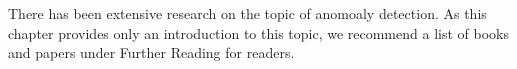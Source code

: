 There has been extensive research on the topic of anomoaly detection.
As this chapter provides only an introduction to this
topic,
we recommend a list of books and 
papers under Further Reading for readers.







